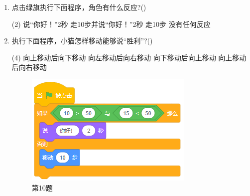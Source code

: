 \documentclass[10pt, a4paper]{article}
\begin{document}
\begin{enumerate}
        \item 点击绿旗执行下面程序，角色有什么反应?(\qquad)
        \begin{tasks}(2)
            \task 说“你好！”2秒
            \task 走10步并说“你好！”2秒
            \task 走10步
            \task 没有任何反应
        \end{tasks}

        \item 执行下面程序，小猫怎样移动能够说“胜利”?(\qquad)
        \begin{tasks}(4)
            \task 向上移动后向下移动
            \task 向左移动后向右移动
            \task 向下移动后向上移动
            \task 向上移动后向右移动
        \end{tasks}

        \begin{figure}[htbp]
            \centering
            \begin{minipage}[t]{.25\textwidth}
                \centering
                \includegraphics[width=\textwidth]{10.png}
                \caption*{第10题}
            \end{minipage}
            \begin{minipage}[t]{.4\textwidth}
                \centering
                \begin{minipage}[t]{.35\textwidth}
                    \centering

\end{minipage}
\end{minipage}
\end{figure}
\end{enumerate}
\end{document}
